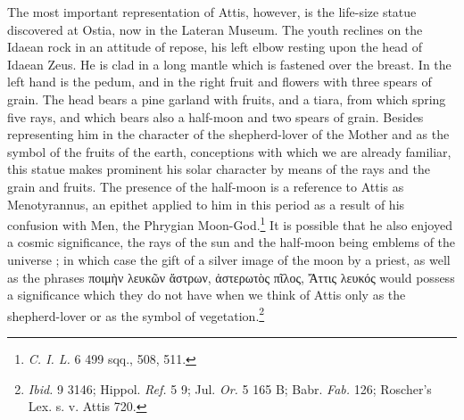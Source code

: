\documentclass[a4paper, 11pt, oneside, polutonikogreek, english]{article}
\begin{document}
The most important representation of Attis, however, is the life-size statue discovered at Ostia, now in the Lateran Museum. The youth reclines on the Idaean rock in an attitude of repose, his left elbow resting upon the head of Idaean Zeus. He is clad in a long mantle which is fastened over the breast. In the left hand is the pedum, and in the right fruit and flowers with three spears of grain. The head bears a pine garland with fruits, and a tiara, from which spring five rays, and which bears also a half-moon and two spears of grain. Besides representing him in the character of the shepherd-lover of the Mother and as the symbol of the fruits of the earth, conceptions with which we are already familiar, this statue makes prominent his solar character by means of the rays and the grain and fruits. The presence of the half-moon is a reference to Attis as Menotyrannus, an epithet applied to him in this period as a result of his confusion with Men, the Phrygian Moon-God.\footnote{\emph{C. I. L.} 6 499 sqq., 508, 511.} It is possible that he also enjoyed a cosmic significance, the rays of the sun and the half-moon being emblems of the universe ; in which case the gift of a silver image of the moon by a priest, as well as the phrases ποιμὴν λευκῶν ἄστρων, ἀστερωτὸς πῖλος, Ἄττις λευκός would possess a significance which they do not have when we think of Attis only as the shepherd-lover or as the symbol of vegetation.\footnote{\emph{Ibid.} 9 3146; Hippol. \emph{Ref.} 5 9; Jul. \emph{Or.} 5 165 B; Babr. \emph{Fab.} 126; Roscher's Lex. s. v. Attis 720.}
\end{document}
